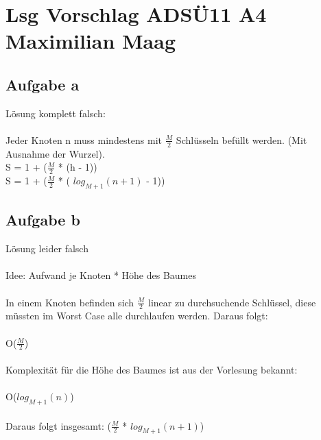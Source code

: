 \documentclass{article}
\begin{document}
	\section*{Lsg Vorschlag ADSÜ11 A4 Maximilian Maag}
	\subsection*{Aufgabe a}
	Lösung komplett falsch: \\ \\
	Jeder Knoten n muss mindestens mit $\frac{M}{2}$ Schlüsseln befüllt werden. (Mit Ausnahme der Wurzel). \\
	S = 1 + ($\frac{M}{2}$ * (h - 1)) \\
	S = 1 + ($\frac{M}{2}$ * ( $log_{M+1}(n+1)$ - 1)) \\
	\subsection*{Aufgabe b}
	Lösung leider falsch \\ \\
	Idee: Aufwand je Knoten * Höhe des Baumes \\ \\
	In einem Knoten befinden sich $\frac{M}{2}$ linear zu durchsuchende Schlüssel, diese müssten im Worst Case alle durchlaufen werden. Daraus folgt: \\ \\
	O($\frac{M}{2}$) \\ \\
	Komplexität für die Höhe des Baumes ist aus der Vorlesung bekannt: \\
	\\
	O($log_{M+1}(n)$) \\ \\
	Daraus folgt insgesamt: ($\frac{M}{2}$ * $log_{M+1}(n+1)$)
\end{document}
